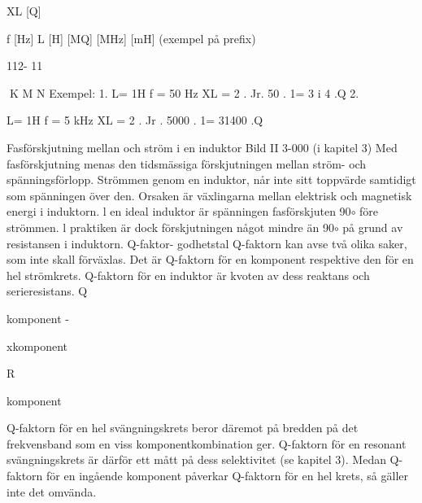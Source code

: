 XL [Q]

f [Hz] L [H]
[MQ]
[MHz] [mH]
(exempel på prefix)

112- 11

K M N
Exempel:
1.
L= 1H
f = 50 Hz
XL = 2 . Jr. 50 . 1= 3 i 4 .Q
2.

L= 1H
f = 5 kHz
XL = 2 . Jr . 5000 . 1= 31400 .Q

Fasförskjutning mellan
och
ström i en induktor
Bild II 3-000 (i kapitel 3)
Med fasförskjutning menas den tidsmässiga förskjutningen mellan ström- och
spänningsförlopp. Strömmen genom en induktor, når inte sitt toppvärde samtidigt som
spänningen över den. Orsaken är växlingarna mellan elektrisk och magnetisk energi i
induktorn.
l en ideal induktor är spänningen fasförskjuten 90\(\circ\) före strömmen. l praktiken är
dock förskjutningen något mindre än 90\(\circ\) på
grund av resistansen i induktorn.
Q-faktor- godhetstal
Q-faktorn kan avse två olika saker, som inte
skall förväxlas. Det är Q-faktorn för en komponent respektive den för en hel strömkrets.
Q-faktorn för en induktor är kvoten av
dess reaktans och serieresistans.
Q

komponent -

xkomponent

R

komponent

Q-faktorn för en hel svängningskrets beror däremot på bredden på det frekvensband som en viss komponentkombination
ger. Q-faktorn för en resonant svängningskrets är därför ett mått på dess selektivitet
(se kapitel 3).
Medan Q-faktorn för en ingående komponent påverkar Q-faktorn för en hel krets,
så gäller inte det omvända.

